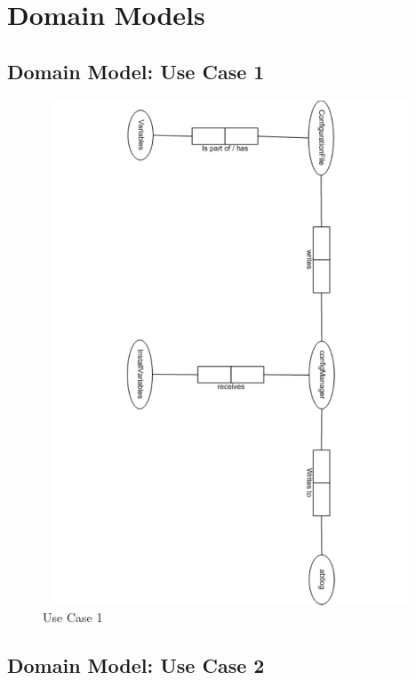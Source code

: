 \newpage
\section{Domain Models}

\subsection{Domain Model: Use Case 1}

\begin{figure}[htbp]
  \centering
  \includegraphics[angle=90,width=15cm,height=15cm]{"domainmodel-usecase1"}
  \caption{Use Case 1}
  \label{fig:usecase1}
\end{figure}

\newpage
\subsection{Domain Model: Use Case 2}

